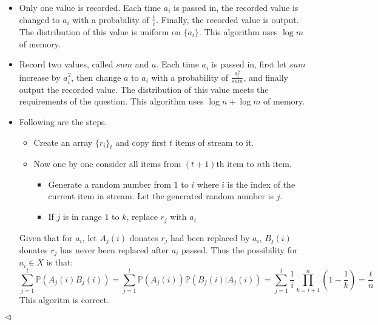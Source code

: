 \documentclass[11pt]{article}
\newenvironment{answer}[1][Answer]{\begin{trivlist}
\item[\hskip \labelsep {\bfseries #1.}\hskip \labelsep]}{\hfill$\lhd$\end{trivlist}}
\begin{document}
\begin{answer}
\begin{itemize}
    \item [(1)] Only one value is recorded. Each time $a_i$ is passed in, the recorded value is changed to $a_i$ with a probability of $\frac{1}{i}$. Finally, the recorded value is output. The distribution of this value is uniform on $\{a_i\}$. This algorithm uses $\log m$ of memory.
    \item [(2)] Record two values, called $sum$ and $a$. Each time $a_i$ is passed in, first let $sum$ increase by $a_i^2$, then change $a$ to $a_i$ with a probability of $\frac{a_i^2}{sum}$, and finally output the recorded value. The distribution of this value meets the requirements of the question. This algorithm uses $\log n + \log m$ of memory.
    \item [(3)]Following are the steps.
    \begin{itemize}
        \item Create an array $\{r_i\}_t$ and copy first $t$ items of stream to it.
        \item Now one by one consider all items from $(t+1)$th item to $n$th item. 
        \begin{itemize}
            \item Generate a random number from $1$ to $i$ where $i$ is the index of the current item in stream. Let the generated random number is $j$.
            \item If $j$ is in range $1$ to $k$, replace $r_j$ with $a_i$
        \end{itemize}
    \end{itemize}
    Given that for $a_i$, let $A_j(i)$ donates $r_j$ had been replaced by $a_i$, $B_j(i)$ donates $r_j$ has never been replaced after $a_i$ passed. Thus the possibility for $a_i \in X$ is that:
    $$\sum_{j=1}^t \mathbb P(A_j(i)B_j(i)) = \sum_{j=1}^t \mathbb P(A_j(i))\mathbb P(B_j(i)|A_j(i)) = \sum_{j=1}^t\frac{1}{i}\prod_{k=i+1}^n(1-\frac{1}{k}) = \frac{t}{n}$$
    This algoritm is correct.
\end{itemize}
\end{answer}
\end{document}
